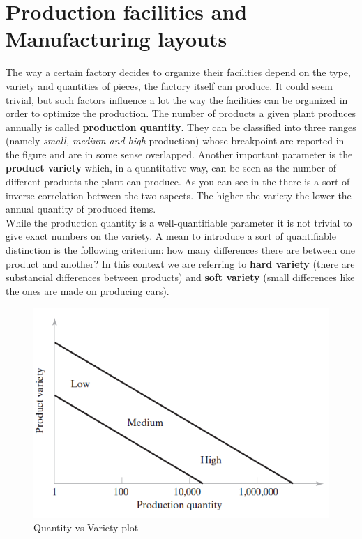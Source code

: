 \section{Production facilities and Manufacturing layouts}
The way a certain factory decides  to organize their facilities depend on the type, variety and quantities of pieces, the factory itself can produce. It could seem trivial, but such factors influence a lot the way the facilities can be organized in order to optimize the production. The \textsf{number of products a given plant produces annually} is called \textbf{production quantity}. They can be classified into three ranges (namely \textit{small, medium and high} production) whose breakpoint are reported in the figure and are in some sense overlapped. Another important parameter is the \textbf{product variety} which, in a quantitative way, can be seen as the number of different products the plant can produce. As you can see in the  there is a sort of inverse correlation between the two aspects. The higher the variety the lower the annual quantity of produced items.\\
While the production quantity is a well-quantifiable parameter it is not trivial to give exact numbers on the variety. A mean to introduce a sort of quantifiable distinction is the following criterium: how many differences there are between one product and another? In this context we are referring to \textbf{hard variety} (there are substancial differences between products) and \textbf{soft variety} (small differences like the ones are made on producing cars).\\
\begin{figure}
    \centering
    \includegraphics[scale=1]{img/quantity_variety.png}
    \caption{Quantity vs Variety plot}
    \label{fig:quantity_variety}
\end{figure}

